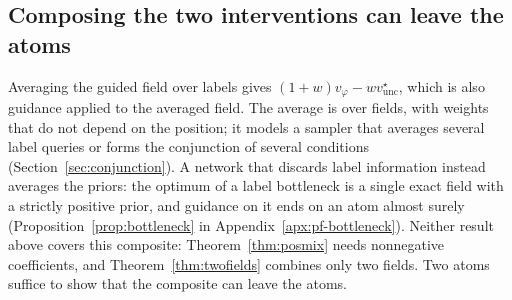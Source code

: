 \documentclass{article} %
\newif\ificlr
\theoremstyle{plain}
\theoremstyle{definition}
\theoremstyle{remark}
\begin{document}
\subsection{Composing the two interventions can leave the atoms}
\label{sec:composition}

Averaging the guided field over labels gives $(1+w)v_\varphi-wv_{\mathrm{unc}}^\star$, which is
also guidance applied to the averaged field. \ificlr The average is over fields, not priors: the
optimum of a label bottleneck averages the priors, and guidance on it ends on an atom almost
surely (Proposition~\ref{prop:bottleneck}).\else The average is over fields, with weights that do
not depend on the position; it models a sampler that averages several label queries or forms the conjunction of several conditions
(Section~\ref{sec:conjunction}). A network that discards label information instead
averages the priors: the optimum of a label bottleneck is a single exact field with a strictly
positive prior, and guidance on it ends on an atom almost surely
(Proposition~\ref{prop:bottleneck} in Appendix~\ref{apx:pf-bottleneck}).\fi{} Neither result above covers this composite:
Theorem~\ref{thm:posmix} needs nonnegative coefficients, and Theorem~\ref{thm:twofields} combines
only two fields. Two atoms suffice to show that the composite can leave the atoms.
\end{document}
